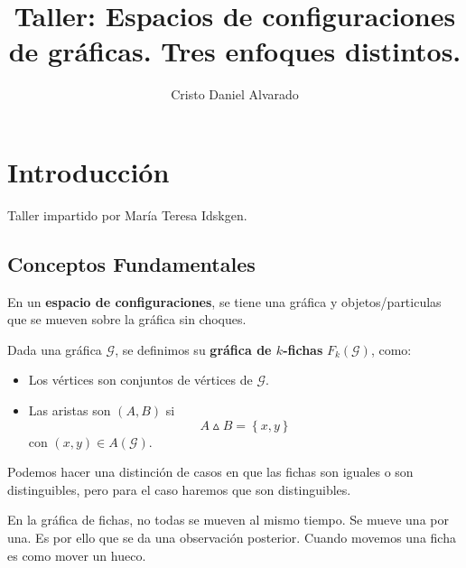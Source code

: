 \documentclass[12pt]{report}
\theoremstyle{largebreak}
\begin{document}
    \setlength{\parskip}{5pt} %
    \setlength{\parindent}{12pt} %
    \title{Taller: Espacios de configuraciones de gráficas. Tres enfoques distintos.}
    \author{Cristo Daniel Alvarado}
    \maketitle

    \tableofcontents %

    
    \chapter{Introducción}
    
    Taller impartido por María Teresa Idskgen.

    \section{Conceptos Fundamentales}

    En un \textbf{espacio de configuraciones}, se tiene una gráfica y objetos/particulas que se mueven sobre la gráfica sin choques.

    \begin{mydef}
        Dada una gráfica $\mathcal{G}$, se definimos su \textbf{gráfica de $k$-fichas} $F_k(\mathcal{G})$, como:
        \begin{itemize}
            \item Los vértices son conjuntos de vértices de $\mathcal{G}$.
            \item Las aristas son $(A,B)$ si
            \begin{equation*}
                A\vartriangle B=\left\{x,y\right\}
            \end{equation*}
            con $(x,y)\in A(\mathcal{G})$.
        \end{itemize}
    \end{mydef}

    \begin{obs}
        Podemos hacer una distinción de casos en que las fichas son iguales o son distinguibles, pero para el caso haremos que son distinguibles.
    \end{obs}

    \begin{obs}
        En la gráfica de fichas, no todas se mueven al mismo tiempo. Se mueve una por una. Es por ello que se da una observación posterior. Cuando movemos una ficha es como mover un hueco.
    \end{obs}
\end{document}
